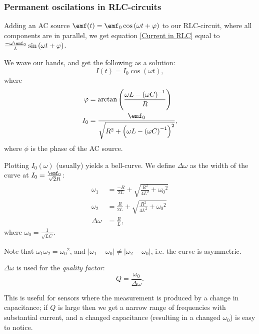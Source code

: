     \subsubsection{Permanent oscilations in RLC-circuits}

        Adding an AC source $\emf(t) = \emf_0\cos\left(\omega t + \phi\right)$ to our RLC-circuit, where all components are in parallel, 
        we get equation \eqref{Current in RLC} equal to $\frac{-\omega\emf_0}{L}\sin\left(\omega t + \phi\right)$.
        
        We wave our hands, and get the following as a solution: 
        \begin{equation}
            I(t) = I_0 \cos\left(\omega t\right),
        \end{equation}
        where 
        \begin{align*}
            \phi &= \text{arctan} \left(\frac{\omega L - \left(\omega C\right)^{-1}}{R}\right)\\
            I_0 &= \frac{\emf_0}{\sqrt{R^2 + \left(\omega L - \left(\omega C\right)^{-1}\right)^2}},
        \end{align*}
        where $\phi$ is the phase of the AC source.

        Plotting $I_0(\omega)$ (usually) yields a bell-curve. We define $\Delta\omega$ as the width of the curve at $I_0 = \frac{\emf_0}{\sqrt{2}R}$: 
        \begin{align*}
            \omega_1 &= \frac{-R}{2L} + \sqrt{\frac{R^2}{4L^2} + {\omega_0}^2}\\
            \omega_2 &= \frac{R}{2L} + \sqrt{\frac{R^2}{4L^2} + {\omega_0}^2}\\
            \Delta\omega &= \frac{R}{L},
        \end{align*}
        where $\omega_0 = \frac{1}{\sqrt{LC}}$.

        Note that $\omega_1\omega_2={\omega_0}^2$, and $|\omega_1 - \omega_0| \neq |\omega_2 - \omega_0|$, i.e. the curve is asymmetric.

        $\Delta\omega$ is used for the \textit{quality factor}:
        \begin{equation}
            Q = \frac{\omega_0}{\Delta\omega}.
        \end{equation}

        This is useful for sensors where the measurement is produced by a change in capacitance; 
        if $Q$ is large then we get a narrow range of frequencies with substantial current, and a changed capacitance 
        (resulting in a changed $\omega_0$) is easy to notice. 


